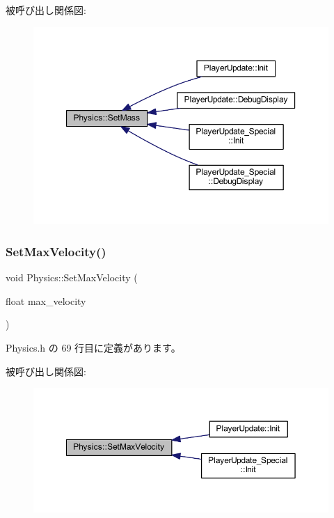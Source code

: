 被呼び出し関係図\+:\nopagebreak
\begin{figure}[H]
\begin{center}
\leavevmode
\includegraphics[width=350pt]{class_physics_a7a6eac8c5f6d7db0baef290710825085_icgraph}
\end{center}
\end{figure}
\mbox{\label{class_physics_afd9e36bb94e921a41818f261df4205d0}} 
\subsubsection{\texorpdfstring{Set\+Max\+Velocity()}{SetMaxVelocity()}}
{\footnotesize\ttfamily void Physics\+::\+Set\+Max\+Velocity (\begin{DoxyParamCaption}\item[{float}]{max\+\_\+velocity }\end{DoxyParamCaption})\hspace{0.3cm}{\ttfamily [inline]}}



 Physics.\+h の 69 行目に定義があります。

被呼び出し関係図\+:\nopagebreak
\begin{figure}[H]
\begin{center}
\leavevmode
\includegraphics[width=350pt]{class_physics_afd9e36bb94e921a41818f261df4205d0_icgraph}
\end{center}
\end{figure}
\mbox{\label{class_physics_a662185709961c64615c51ac5f32ab2ff}} 
